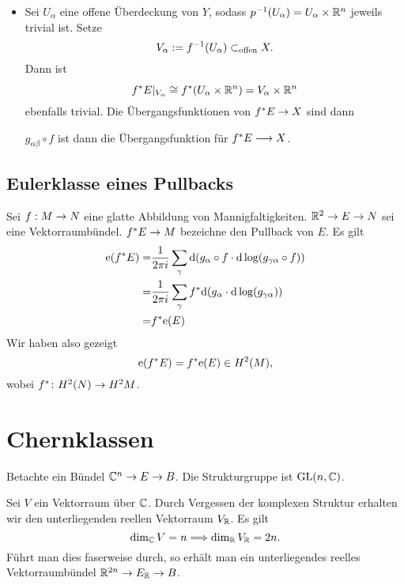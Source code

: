 \begin{itemize}
	\item Sei $U_\alpha$ eine offene Überdeckung von $Y$, sodass $p^{-1}(U_\alpha) = U_\alpha \times \mathbb{R}^n$ jeweils trivial ist. Setze
	\[ V_\alpha := f^{-1}(U_\alpha) \subset_{\text{offen}} X. \]
	Dann ist
	\[f^*E|_{V_\alpha}\overset{}{\cong} f^*(U_\alpha \times \mathbb{R}^n) = V_\alpha \times \mathbb{R}^n\]
	ebenfalls trivial.
	Die Übergangsfunktionen von $f^*E \overset{}{\rightarrow} X$ sind dann
	\begin{center}
	\end{center}
$g_{\alpha \beta}\circ f$ ist dann die Übergangsfunktion für $f^*E \overset{}{\longrightarrow} X$.
\end{itemize}

\subsection{Eulerklasse eines Pullbacks}
Sei $f : M \overset{}{\rightarrow} N$ eine glatte Abbildung von Mannigfaltigkeiten. $\mathbb{R}^2 \overset{}{\rightarrow} E \overset{}{\rightarrow} N$ sei eine Vektorraumbündel. $f^*E \overset{}{\rightarrow} M$  bezeichne den Pullback von $E$. Es gilt
\begin{align*}
\mathrm{e}(f^*E) 
= &
\frac{1}{2\pi i}
\sum_\gamma \text{d} (g_\alpha \circ f \cdot \text{d} \log (g_{\gamma\alpha} \circ f))\\
= & \frac{1}{2\pi i}
\sum_\gamma f^*\text{d} (g_\alpha \cdot \text{d} \log (g_{\gamma\alpha} ))\\
= & f^*\mathrm{e} (E)
\end{align*}
Wir haben also gezeigt
\[ \mathrm{e} (f^* E) = f^*\mathrm{e}(E) \in H^2(M), \]
wobei $f^*\colon H^2(N) \overset{}{\rightarrow} H^2 M$.


\section{Chernklassen}
Betachte ein Bündel $\mathbb{C}^n \overset{}{\rightarrow} E \overset{}{\rightarrow} B$. Die Strukturgruppe ist $\mathrm{GL}(n,\mathbb{C})$.

Sei $V$ ein Vektorraum über $\mathbb{C}$. Durch Vergessen der komplexen Struktur erhalten wir den unterliegenden reellen Vektorraum $V_{\mathbb{R}}$. Es gilt
\[ \dim_{\mathbb{C}} V = n  \overset{}{\Longrightarrow} \dim_{\mathbb{R}} V_{\mathbb{R}} = 2n. \]
Führt man dies faserweise durch, so erhält man ein unterliegendes reelles Vektorraumbündel $\mathbb{R}^{2n} \overset{}{\rightarrow} E_{\mathbb{R}} \overset{}{\rightarrow} B$.


